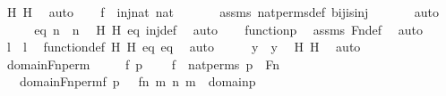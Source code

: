 \begin{isabellebody}
\ H\ H{\isacharprime}{\kern0pt}\ \isamarkupfalse%
\ auto\isanewline
\isanewline
\ \ \isamarkupfalse%
\ {\isachardoublequoteopen}f\ {\isasymin}\ inj{\isacharparenleft}{\kern0pt}nat{\isacharcomma}{\kern0pt}\ nat{\isacharparenright}{\kern0pt}{\isachardoublequoteclose}\ \isanewline
\ \ \ \ \isamarkupfalse%
\ assms\ nat{\isacharunderscore}{\kern0pt}perms{\isacharunderscore}{\kern0pt}def\ bij{\isacharunderscore}{\kern0pt}is{\isacharunderscore}{\kern0pt}inj\ \isanewline
\ \ \ \ \isamarkupfalse%
\ auto\isanewline
\ \ \isamarkupfalse%
\ \isamarkupfalse%
\ eq{\isacharprime}{\kern0pt}{\isacharcolon}{\kern0pt}\ {\isachardoublequoteopen}n\ {\isacharequal}{\kern0pt}\ n{\isacharprime}{\kern0pt}{\isachardoublequoteclose}\ \isamarkupfalse%
\ H\ H{\isacharprime}{\kern0pt}\ eq\ inj{\isacharunderscore}{\kern0pt}def\ \isamarkupfalse%
\ auto\isanewline
\isanewline
\ \ \isamarkupfalse%
\ {\isachardoublequoteopen}function{\isacharparenleft}{\kern0pt}p{\isacharparenright}{\kern0pt}{\isachardoublequoteclose}\ \isamarkupfalse%
\ assms\ Fn{\isacharunderscore}{\kern0pt}def\ \isamarkupfalse%
\ auto\isanewline
\ \ \isamarkupfalse%
\ \isamarkupfalse%
\ {\isachardoublequoteopen}l\ {\isacharequal}{\kern0pt}\ l{\isacharprime}{\kern0pt}{\isachardoublequoteclose}\ \isamarkupfalse%
\ function{\isacharunderscore}{\kern0pt}def\ H\ H{\isacharprime}{\kern0pt}\ eq\ eq{\isacharprime}{\kern0pt}\ \isamarkupfalse%
\ auto\isanewline
\ \ \isamarkupfalse%
\ \isamarkupfalse%
\ {\isachardoublequoteopen}y\ {\isacharequal}{\kern0pt}\ y{\isacharprime}{\kern0pt}{\isachardoublequoteclose}\ \isamarkupfalse%
\ H\ H{\isacharprime}{\kern0pt}\ \isamarkupfalse%
\ auto\isanewline
{}\isamarkupfalse%
%
\endisatagproof
{\isafoldproof}%
%
\isadelimproof
\isanewline
%
\endisadelimproof
\isanewline
{}\isamarkupfalse%
\ domain{\isacharunderscore}{\kern0pt}Fn{\isacharunderscore}{\kern0pt}perm\ {\isacharcolon}{\kern0pt}\ \isanewline
\ \ \ f\ p\ \isanewline
\ \ \ {\isachardoublequoteopen}f\ {\isasymin}\ nat{\isacharunderscore}{\kern0pt}perms{\isachardoublequoteclose}\ {\isachardoublequoteopen}p\ {\isasymin}\ Fn{\isachardoublequoteclose}\ \isanewline
\ \ \ {\isachardoublequoteopen}domain{\isacharparenleft}{\kern0pt}Fn{\isacharunderscore}{\kern0pt}perm{\isacharparenleft}{\kern0pt}f{\isacharcomma}{\kern0pt}\ p{\isacharparenright}{\kern0pt}{\isacharparenright}{\kern0pt}\ {\isacharequal}{\kern0pt}\ {\isacharbraceleft}{\kern0pt}\ {\isacharless}{\kern0pt}f{\isacharbackquote}{\kern0pt}n{\isacharcomma}{\kern0pt}\ m{\isachargreater}{\kern0pt}{\isachardot}{\kern0pt}\ {\isacharless}{\kern0pt}n{\isacharcomma}{\kern0pt}\ m{\isachargreater}{\kern0pt}\ {\isasymin}\ domain{\isacharparenleft}{\kern0pt}p{\isacharparenright}{\kern0pt}\ {\isacharbraceright}{\kern0pt}{\isachardoublequoteclose}\ \isanewline

\end{isabellebody}
